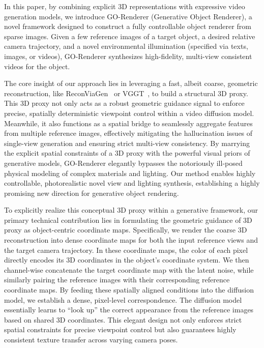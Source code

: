\documentclass[runningheads]{llncs}
\begin{document}
In this paper, by combining explicit 3D representations with expressive video generation models, we introduce GO-Renderer (Generative Object Renderer), a novel framework designed to construct a fully controllable object renderer from sparse images. Given a few reference images of a target object, a desired relative camera trajectory, and a novel environmental illumination (specified via texts, images, or videos), GO-Renderer synthesizes high-fidelity, multi-view consistent videos for the object. 

The core insight of our approach lies in leveraging a fast, albeit coarse, geometric reconstruction, like ReconViaGen~\cite{reconviagen} or VGGT~\cite{vggt}, to build a structural 3D proxy. This 3D proxy not only acts as a robust geometric guidance signal to enforce precise, spatially deterministic viewpoint control within a video diffusion model. Meanwhile, it also functions as a spatial bridge to seamlessly aggregate features from multiple reference images, effectively mitigating the hallucination issues of single-view generation and ensuring strict multi-view consistency. By marrying the explicit spatial constraints of a 3D proxy with the powerful visual priors of generative models, GO-Renderer elegantly bypasses the notoriously ill-posed physical modeling of complex materials and lighting. Our method enables highly controllable, photorealistic novel view and lighting synthesis, establishing a highly promising new direction for generative object rendering.

To explicitly realize this conceptual 3D proxy within a generative framework, our primary technical contribution lies in formulating the geometric guidance of 3D proxy as object-centric coordinate maps. Specifically, we render the coarse 3D reconstruction into dense coordinate maps for both the input reference views and the target camera trajectory. In these coordinate maps, the color of each pixel directly encodes its 3D coordinates in the object's coordinate system. We then channel-wise concatenate the target coordinate map with the latent noise, while similarly pairing the reference images with their corresponding reference coordinate maps. By feeding these spatially aligned conditions into the diffusion model, we establish a dense, pixel-level correspondence. The diffusion model essentially learns to ``look up'' the correct appearance from the reference images based on shared 3D coordinates. This elegant design not only enforces strict spatial constraints for precise viewpoint control but also guarantees highly consistent texture transfer across varying camera poses.
\end{document}
